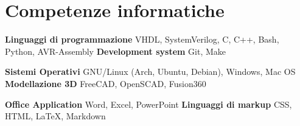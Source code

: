 \section{Competenze informatiche}





\cvdoubleitem{}
{
  \textbf{Linguaggi di programmazione}\vspace{1mm}\newline{}
  VHDL, SystemVerilog, C, C++, Bash, Python, AVR-Assembly
}
{}
{
  \textbf{Development system}\vspace{1mm}\newline{}
  Git, Make
}

\vspace{2mm}

\cvdoubleitem{}
{
  \textbf{Sistemi Operativi}\vspace{1mm}\newline{}
  GNU/Linux (Arch, Ubuntu, Debian), Windows, Mac OS
}
{}
{
  \textbf{Modellazione 3D}\vspace{1mm}\newline{}
  FreeCAD, OpenSCAD, Fusion360
}

\vspace{2mm}

\cvdoubleitem {}
{
  \textbf{Office Application}\vspace{1mm}\newline{}
  Word, Excel, PowerPoint
}
{}
{
  \textbf{Linguaggi di markup}\vspace{1mm}\newline{}
  CSS, HTML, \LaTeX, Markdown
}
